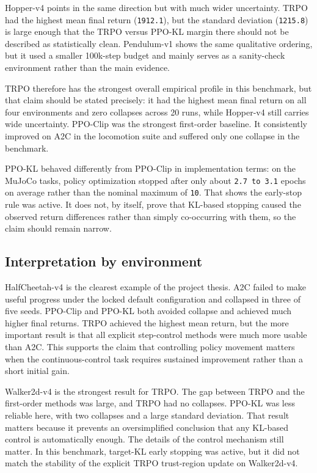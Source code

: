 \documentclass{article}
\begin{document}
Hopper-v4 points in the same direction but with much wider uncertainty. TRPO had the highest mean final return (\texttt{1912.1}), but the standard deviation (\texttt{1215.8}) is large enough that the TRPO versus PPO-KL margin there should not be described as statistically clean. Pendulum-v1 shows the same qualitative ordering, but it used a smaller 100k-step budget and mainly serves as a sanity-check environment rather than the main evidence.

TRPO therefore has the strongest overall empirical profile in this benchmark, but that claim should be stated precisely: it had the highest mean final return on all four environments and zero collapses across 20 runs, while Hopper-v4 still carries wide uncertainty. PPO-Clip was the strongest first-order baseline. It consistently improved on A2C in the locomotion suite and suffered only one collapse in the benchmark.

PPO-KL behaved differently from PPO-Clip in implementation terms: on the MuJoCo tasks, policy optimization stopped after only about \texttt{2.7 to 3.1} epochs on average rather than the nominal maximum of \texttt{10}. That shows the early-stop rule was active. It does not, by itself, prove that KL-based stopping caused the observed return differences rather than simply co-occurring with them, so the claim should remain narrow.

\subsection{Interpretation by environment}

HalfCheetah-v4 is the clearest example of the project thesis. A2C failed to make useful progress under the locked default configuration and collapsed in three of five seeds. PPO-Clip and PPO-KL both avoided collapse and achieved much higher final returns. TRPO achieved the highest mean return, but the more important result is that all explicit step-control methods were much more usable than A2C. This supports the claim that controlling policy movement matters when the continuous-control task requires sustained improvement rather than a short initial gain.

Walker2d-v4 is the strongest result for TRPO. The gap between TRPO and the first-order methods was large, and TRPO had no collapses. PPO-KL was less reliable here, with two collapses and a large standard deviation. That result matters because it prevents an oversimplified conclusion that any KL-based control is automatically enough. The details of the control mechanism still matter. In this benchmark, target-KL early stopping was active, but it did not match the stability of the explicit TRPO trust-region update on Walker2d-v4.
\end{document}
